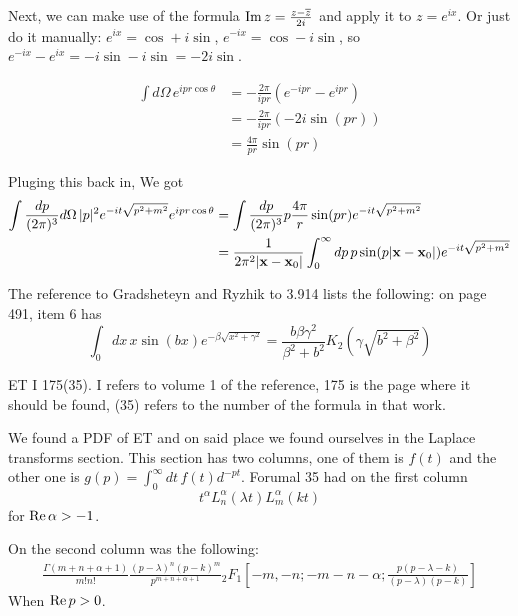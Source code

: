 Next, we can make use of the formula $\operatorname{Im}{z} = \frac{z - \overline{z}}{2i}$ and apply it to $z = e^{ix}$.
Or just do it manually: $e^{ix} = \cos + i\sin$, $e^{-ix} = \cos -i\sin$, so
$e^{-ix} - e^{ix} = -i\sin -i\sin = -2i \sin$.

\begin{align*}
\int d\Omega \, e^{ipr\cos\theta} &= 
    -\frac{2\pi}{ipr} \left( e^{-ipr} - e^{ipr} \right) \\
&= -\frac{2\pi}{ipr} \left(-2i \sin(pr) \right) \\
&= \frac{4\pi}{pr} \sin(pr)
\end{align*}

Pluging this back in,
We got
\begin{align}
\int \frac{dp}{(2\pi)^3} d\Omega \, |p|^2 e^{-it\sqrt{p^2 + m^2}} e^{ipr\cos\theta} &=
\int \frac{dp}{(2\pi)^3} p \frac{4\pi}{r} \sin(pr) e^{-it\sqrt{p^2 + m^2}} \\
&= \frac{1}{2\pi^2 |\boldsymbol{\mathbf{x}}-\boldsymbol{\mathbf{x}}_0|}
    \int_{0}^{\infty} dp \, p \sin(p|\boldsymbol{\mathbf{x}}-\boldsymbol{\mathbf{x}}_0|) e^{-it\sqrt{p^2 + m^2}} \label{kg-relativistic-simplified}
\end{align}

The reference to Gradsheteyn and Ryzhik to 3.914 lists the following: on page 491, item 6 has
\begin{equation}
\int_{0} dx\, x \sin(bx) e^{-\beta \sqrt{x^2 + \gamma^2}} =
    \frac{b \beta \gamma^2}{\beta^2 + b^2} K_2\left(\gamma \sqrt{b^2 + \beta^2}\right) \label{Gradsheteyn-kg-relativistic}
\end{equation}

ET I 175(35).
I refers to volume 1 of the reference, 175 is the page where it should be found, (35) refers to the number of the formula
in that work.

We found a PDF of ET and on said place we found ourselves in the Laplace transforms section.
This section has two columns, one of them is $f(t)$ and the other one is $g(p) = \int_{0}^{\infty} dt\, f(t) d^{-pt}$.
Forumal 35 had on the first column
$$
t^\alpha L_{n}^{\alpha} (\lambda t) L_{m}^{\alpha} (k t)
$$
for $\operatorname{Re}{\alpha} > -1$.

On the second column was the following:
\begin{align*}
\frac{\Gamma(m+n+\alpha + 1)}{m! n!}
\frac{(p-\lambda)^n (p-k)^m}{p^{m+n+\alpha +1}}
{}_{2}F_{1} \left[ -m, -n; -m-n-\alpha; \frac{p(p-\lambda -k)}{(p-\lambda)(p-k)} \right]
\end{align*}
When $\operatorname{Re}{p} > 0$.
\\

